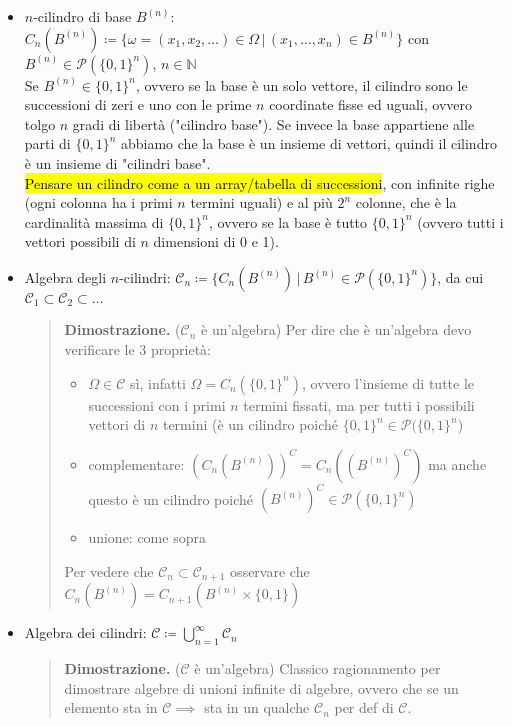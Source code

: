 \documentclass[a4paper,10pt]{article}
\theoremstyle{remark}
\theoremstyle{definition}
\newenvironment{dimo}{\begin{quote}\textbf{Dimostrazione.}}{\end{quote}} %
\begin{document}
\begin{itemize}
\item $n$-cilindro di base $B^{(n)}$: $C_{n}(B^{(n)})\coloneqq\{ \omega=(x_{1},x_{2},\dots)\in\Omega\,|\,(x_{1},\dots,x_{n})\in B^{(n)}\} $
con $B^{(n)}\in\mathscr{P}(\{ 0,1\} ^{n})$, $n\in\mathbb{N}$ \\
Se $B^{(n)} \in \{0,1\}^n$, ovvero se la base è un solo vettore, il cilindro sono le successioni di zeri e uno con le prime $n$ coordinate fisse ed uguali, ovvero tolgo $n$ gradi di libertà ("cilindro base"). Se invece la base appartiene alle parti di $\{0,1\}^n$ abbiamo che la base è un insieme di vettori, quindi il cilindro è un insieme di "cilindri base". \\
\hl{Pensare un cilindro come a un array/tabella di successioni}, con infinite righe (ogni colonna ha i primi $n$ termini uguali) e al più $2^n$ colonne, che è la cardinalità massima di $\{0,1\}^n$, ovvero se la base è tutto  $\{0,1\}^n$ (ovvero tutti i vettori possibili di $n$ dimensioni di 0 e 1).
\item Algebra degli $n$-cilindri: $\mathscr{C}_{n}\coloneqq\{ C_{n}(B^{(n)})\,|\,B^{(n)}\in\mathscr{P}(\{ 0,1\} ^{n})\} $,
da cui $\mathscr{C}_{1}\subset\mathscr{C}_{2}\subset\dots$

\begin{dimo}
    ($\mathscr{C}_{n}$ è un'algebra) Per dire che è un'algebra devo verificare le 3 proprietà:
    \begin{itemize}
        \item $\Omega\in\mathscr{C}$ sì, infatti $\Omega=C_n(\{0,1\}^n)$, ovvero l'insieme di tutte le successioni con i primi $n$ termini fissati, ma per tutti i possibili vettori di $n$ termini (è un cilindro poiché $\{0,1\}^n \in \mathscr{P}(\{0,1\}^n$)
        \item complementare: $(C_n(B^{(n)}))^C=C_n((B^{(n)})^C)$ ma anche questo è un cilindro poiché $(B^{(n)})^C \in \mathscr{P}(\{0,1\}^n)$
        \item unione: come sopra
    \end{itemize}
    Per vedere che $\mathscr C_n \subset \mathscr C_{n+1} $ osservare che $C_n(B^{(n)}) = C_{n+1}(B^{(n)}\times \{0,1\})$
\end{dimo}

\item Algebra dei cilindri: $\mathscr{C}\coloneqq\bigcup_{n=1}^\infty\mathscr{C}_{n}$

\begin{dimo}
   ($\mathscr{C}$ è un'algebra) Classico ragionamento per dimostrare algebre di unioni infinite di algebre, ovvero che se un elemento sta in $\mathscr{C} \implies $ sta in un qualche $\mathscr{C}_n$ per def di $\mathscr{C}$.
\end{dimo}


\end{itemize}
\end{document}
